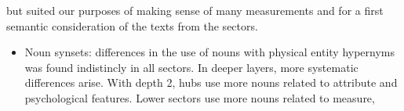 																																																																																																																																																																																																																																																																																																																																												but suited our purposes of making sense of many measurements
																																																																																																																																																																																																																																																																																																																																												and for a first semantic consideration of the texts from the sectors. 

																																																																																																																																																																																																																																																																																																																																												\begin{itemize}
																																																																																																																																																																																																																																																																																																																																													\item Noun synsets: differences in the use of nouns with physical entity hypernyms was found indistincly in all sectors.
																																																																																																																																																																																																																																																																																																																																															In deeper layers, more systematic differences arise.
																																																																																																																																																																																																																																																																																																																																																	With depth 2, hubs use more nouns related to attribute and psychological features.
																																																																																																																																																																																																																																																																																																																																																			Lower sectors use more nouns related to measure,

\end{itemize}

